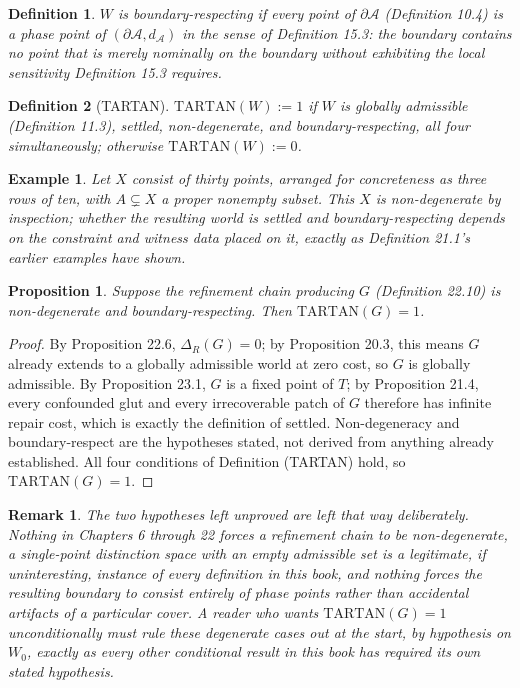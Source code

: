 \documentclass[11pt]{book}
\newtheorem*{appendixdefinition}{Definition}
\newtheorem*{appendixproposition}{Proposition}
\newtheorem*{appendixremark}{Remark}
\newtheorem*{appendixexample}{Example}
\begin{document}
\begin{appendixdefinition}
$W$ is \emph{boundary-respecting} if every point of $\partial \mathcal A$ (Definition 10.4) is a phase point of $(\partial \mathcal A, d_{\mathcal A})$ in the sense of Definition 15.3: the boundary contains no point that is merely nominally on the boundary without exhibiting the local sensitivity Definition 15.3 requires.
\end{appendixdefinition}

\begin{appendixdefinition}[TARTAN]
$\mathrm{TARTAN}(W) := 1$ if $W$ is globally admissible (Definition 11.3), settled, non-degenerate, and boundary-respecting, all four simultaneously; otherwise $\mathrm{TARTAN}(W) := 0$.
\end{appendixdefinition}

\begin{appendixexample}
Let $X$ consist of thirty points, arranged for concreteness as three rows of ten, with $A \subsetneq X$ a proper nonempty subset. This $X$ is non-degenerate by inspection; whether the resulting world is settled and boundary-respecting depends on the constraint and witness data placed on it, exactly as Definition 21.1's earlier examples have shown.
\end{appendixexample}

\begin{appendixproposition}
Suppose the refinement chain producing $G$ (Definition 22.10) is non-degenerate and boundary-respecting. Then $\mathrm{TARTAN}(G) = 1$.
\end{appendixproposition}

\begin{proof}
By Proposition 22.6, $\Delta_R(G) = 0$; by Proposition 20.3, this means $G$ already extends to a globally admissible world at zero cost, so $G$ is globally admissible. By Proposition 23.1, $G$ is a fixed point of $T$; by Proposition 21.4, every confounded glut and every irrecoverable patch of $G$ therefore has infinite repair cost, which is exactly the definition of settled. Non-degeneracy and boundary-respect are the hypotheses stated, not derived from anything already established. All four conditions of Definition (TARTAN) hold, so $\mathrm{TARTAN}(G) = 1$.
\end{proof}

\begin{appendixremark}
The two hypotheses left unproved are left that way deliberately. Nothing in Chapters 6 through 22 forces a refinement chain to be non-degenerate, a single-point distinction space with an empty admissible set is a legitimate, if uninteresting, instance of every definition in this book, and nothing forces the resulting boundary to consist entirely of phase points rather than accidental artifacts of a particular cover. A reader who wants $\mathrm{TARTAN}(G) = 1$ unconditionally must rule these degenerate cases out at the start, by hypothesis on $W_0$, exactly as every other conditional result in this book has required its own stated hypothesis.
\end{appendixremark}
\end{document}
